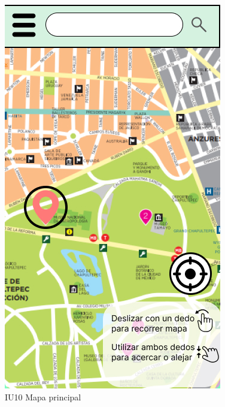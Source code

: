 \begin{figure}[h]
    \begin{minipage}{0.5\textwidth}
        \centering
        \includegraphics[width=.7\linewidth]{Pantallas Prototipo3/IU10 - Mapa principal.jpg}
        \caption{IU10 Mapa principal}
    \end{minipage}%
\end{figure}


